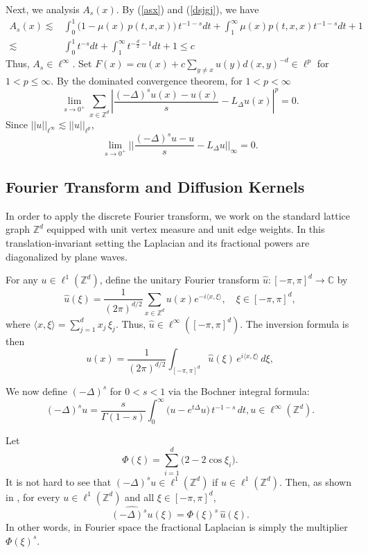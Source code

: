 \documentclass[reqno,12pt]{amsart}
\numberwithin{equation}{section}
\begin{document}
Next, we analysis $A_s\left(x\right).$ By (\ref{asx}) and (\ref{dsjgj}), we have
\[\begin{aligned}
	A_s\left(x\right)\lesssim&\int_{0}^{1}\bigl(1-\mu(x)\,p(t,x,x)\bigr)\,t^{-1-s}dt+\int_{1}^{\infty}\mu(x)p(t,x,x)t^{-1-s}dt+1\\ \lesssim &\int _0^1 t^{-s}dt+\int_1^{\infty}t^{-\frac{d}{2}-1}dt+1\le c
\end{aligned}\]
Thus, $A_s \in \ell^{\infty}.$ Set $F\left(x\right)=cu(x)+c \sum_{y\ne x}u\left(y\right)d\left(x,y\right)^{-d}\in \ell^p$ for $1<p\le \infty.$ By the dominated convergence theorem, for $1<p<\infty$
\[\lim\limits_{s\rightarrow 0^+}\sum_{x\in \mathbb{Z}^d}\left| \frac{(-\Delta)^{s}u(x)-u(x)}{s}-L_{\Delta}u\left(x\right)\right|^p=0.\]
Since $||u||_{\ell^\infty}\lesssim ||u||_{\ell^p}$,
\[\lim\limits_{s\rightarrow 0^+}||\frac{(-\Delta)^{s}u-u}{s}-L_{\Delta}u||_{\infty}=0.\]


\subsection{Fourier Transform and Diffusion Kernels}
In order to apply the discrete Fourier transform, we work on the standard lattice graph \(\mathbb{Z}^d\) equipped with unit vertex measure and unit edge weights. In this translation‐invariant setting the Laplacian and its fractional powers are diagonalized by plane waves.


 For any \(u\in \ell^{1}(\mathbb{Z}^d)\), define the unitary Fourier transform \(\widehat u:[-\pi,\pi]^d\to\mathbb{C}\) by  
\[
\widehat u(\xi)
=\frac{1}{(2\pi)^{d/2}}
\sum_{x\in\mathbb{Z}^d}u(x)e^{-i\langle x,\xi\rangle},
\quad
\xi\in[-\pi,\pi]^d,
\]
where \(\langle x,\xi\rangle=\sum_{j=1}^d x_j\,\xi_j\). Thus, $\widehat u\in \ell^{\infty}\left([-\pi,\pi]^d\right).$ The inversion formula is then
\[
u(x)
=\frac{1}{(2\pi)^{d/2}}
\int_{[-\pi,\pi]^d}\widehat u(\xi)\,e^{i\langle x,\xi\rangle}\,d\xi,
\]


We now define $(-\Delta)^s$ for $0<s<1$ via the Bochner integral formula:
\begin{equation}\label{bochfrac11}
	(-\Delta)^{s}u=\frac{s}{\Gamma(1-s)}
	\int_{0}^{\infty}\bigl(u-e^{t\Delta}u\bigr)\,t^{-1-s}\,dt,u\in \ell^{\infty}(\mathbb{Z}^d).
\end{equation}

 Let
$$
\Phi(\xi)=\sum_{i=1}^d\bigl(2-2\cos\xi_i\bigr).
$$
It is not hard to see that $\left(-\Delta\right)^{s}u \in \ell^1(\mathbb{Z}^d)$ if $u\in\ell^1(\mathbb{Z}^d)$. Then, as shown in \cite{wang2023eigenvalue}, for every $u\in\ell^1(\mathbb{Z}^d)$ and all $\xi\in[-\pi,\pi]^d$,
$$
\widehat{(-\Delta)^s u}(\xi)
=\Phi(\xi)^s\,\widehat u(\xi).
$$
In other words, in Fourier space the fractional Laplacian is simply the multiplier $\Phi(\xi)^s$.
\end{document}
